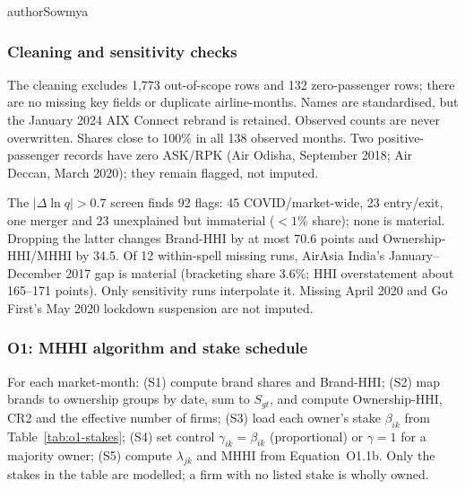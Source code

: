 \begin{mergedcontribution}{authorSowmya}
\subsubsection{Cleaning and sensitivity checks}
\label{app:o1-cleaning}
The cleaning excludes 1,773 out-of-scope rows and 132 zero-passenger rows; there are no missing key fields or duplicate airline-months. Names are standardised, but the January 2024 AIX Connect rebrand is retained. Observed counts are never overwritten. Shares close to 100\% in all 138 observed months. Two positive-passenger records have zero ASK/RPK (Air Odisha, September 2018; Air Deccan, March 2020); they remain flagged, not imputed.

The $|\Delta\ln q|>0.7$ screen finds 92 flags: 45 COVID/market-wide, 23 entry/exit, one merger and 23 unexplained but immaterial ($<1\%$ share); none is material. Dropping the latter changes Brand-HHI by at most 70.6 points and Ownership-HHI/MHHI by 34.5. Of 12 within-spell missing runs, AirAsia India's January--December 2017 gap is material (bracketing share 3.6\%; HHI overstatement about 165--171 points). Only sensitivity runs interpolate it. Missing April 2020 and Go First's May 2020 lockdown suspension are not imputed.

\subsubsection{O1: MHHI algorithm and stake schedule}
\label{app:o1-stakes}
For each market-month: (S1) compute brand shares and Brand-HHI; (S2) map brands to ownership groups by date, sum to $S_{gt}$, and compute Ownership-HHI, CR2 and the effective number of firms; (S3) load each owner's stake $\beta_{ik}$ from Table~\ref{tab:o1-stakes}; (S4) set control $\gamma_{ik}=\beta_{ik}$ (proportional) or $\gamma=1$ for a majority owner; (S5) compute $\lambda_{jk}$ and MHHI from Equation~O1.1b. Only the stakes in the table are modelled; a firm with no listed stake is wholly owned.


\end{mergedcontribution}
